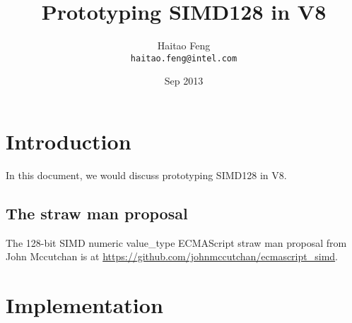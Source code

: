 \documentclass[12pt]{article} %
\title{Prototyping SIMD128 in V8}
\author{Haitao Feng \\
\texttt{haitao.feng@intel.com}}
\date{Sep 2013} %
\begin{document}
\maketitle


\tableofcontents
\newpage

\section{Introduction}

In this document, we would discuss prototyping SIMD128 in V8.

\subsection{The straw man proposal}

The 128-bit SIMD numeric value\_type ECMAScript straw man proposal from John
Mccutchan is at \href{https://github.com/johnmccutchan/ecmascript\_simd}{https://github.com/johnmccutchan/ecmascript\_simd}.

\section{Implementation}
\end{document}

